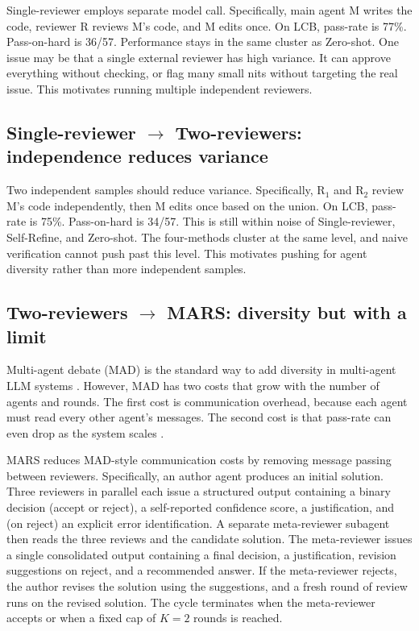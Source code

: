 \documentclass{article}
\begin{document}
Single-reviewer employs separate model call. Specifically,
main agent M writes the code, reviewer R reviews M's code, and M edits once. On LCB, pass-rate
is 77\%. Pass-on-hard is 36/57. Performance stays in the same cluster as Zero-shot. One issue may be that a single external reviewer
has high variance. It can approve everything without checking, or flag
many small nits without targeting the real issue. This motivates running multiple
independent reviewers.

\subsection{Single-reviewer $\to$ Two-reviewers: independence reduces variance}
\label{sec:lcb-tworev}

Two independent samples should reduce variance. Specifically, R$_1$ and R$_2$ review M's code independently, then M edits once
based on the union. On LCB, pass-rate is 75\%. Pass-on-hard is 34/57.
This is still within noise of Single-reviewer, Self-Refine, and Zero-shot. The four-methods cluster at the same level, and naive verification cannot push past this level. This motivates pushing for agent diversity
rather than more independent samples.

\subsection{Two-reviewers $\to$ MARS: diversity but with a limit}
\label{sec:lcb-mar}

Multi-agent debate (MAD) is the standard way to add diversity in
multi-agent LLM systems \citep{du2023mad}. However, MAD has two costs that grow with the number of
agents and rounds. The first cost is communication overhead, because
each agent must read every other agent's messages. The second cost is
that pass-rate can even drop as the system scales \citep{smit2023mad,
scaling-agents}.

MARS \citep{mars2025} reduces MAD-style communication costs by
removing message passing between reviewers. Specifically, an author
agent produces an initial solution. Three reviewers in parallel each issue a structured
output containing a binary decision (accept or reject), a
self-reported confidence score, a justification, and (on reject) an
explicit error identification. A separate meta-reviewer subagent then reads the three
reviews and the candidate solution. The meta-reviewer issues a single
consolidated output containing a final decision, a justification,
revision suggestions on reject, and a recommended answer. If the
meta-reviewer rejects, the author revises the solution using the
suggestions, and a fresh round of review runs on the revised solution.
The cycle terminates when the meta-reviewer accepts or when a fixed
cap of $K{=}2$ rounds is reached.
\end{document}
